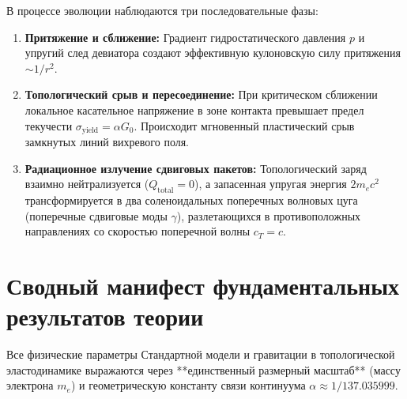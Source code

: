 \documentclass[12pt,a4paper]{article}
\theoremstyle{definition}
\theoremstyle{remark}
\begin{document}
В процессе эволюции наблюдаются три последовательные фазы:
\begin{enumerate}
	\item \textbf{Притяжение и сближение:} Градиент гидростатического давления $p$ и упругий след девиатора создают эффективную кулоновскую силу притяжения $\sim 1/r^2$.
	\item \textbf{Топологический срыв и пересоединение:} При критическом сближении локальное касательное напряжение в зоне контакта превышает предел текучести $\sigma_{\mathrm{yield}} = \alpha G_0$. Происходит мгновенный пластический срыв замкнутых линий вихревого поля.
	\item \textbf{Радиационное излучение сдвиговых пакетов:} Топологический заряд взаимно нейтрализуется ($Q_{\mathrm{total}} = 0$), а запасенная упругая энергия $2 m_e c^2$ трансформируется в два соленоидальных поперечных волновых цуга (поперечные сдвиговые моды $\gamma$), разлетающихся в противоположных направлениях со скоростью поперечной волны $c_T = c$.
\end{enumerate}


\section{Сводный манифест фундаментальных результатов теории}
\label{sec:master_manifest}

Все физические параметры Стандартной модели и гравитации в топологической эластодинамике выражаются через **единственный размерный масштаб** (массу электрона $m_e$) и геометрическую константу связи континуума $\alpha \approx 1/137.035999$.
\end{document}
